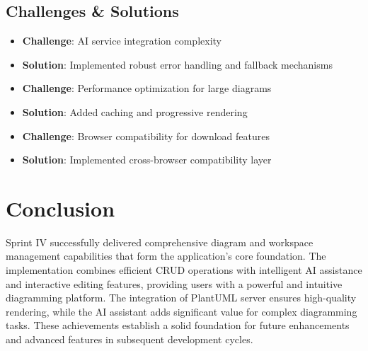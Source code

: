 \subsection{Challenges \& Solutions}
\begin{itemize}
    \item \textbf{Challenge}: AI service integration complexity
    \item \textbf{Solution}: Implemented robust error handling and fallback mechanisms
    \item \textbf{Challenge}: Performance optimization for large diagrams
    \item \textbf{Solution}: Added caching and progressive rendering
    \item \textbf{Challenge}: Browser compatibility for download features
    \item \textbf{Solution}: Implemented cross-browser compatibility layer
\end{itemize}



\section{Conclusion}

Sprint IV successfully delivered comprehensive diagram and workspace management capabilities that form the application's core foundation. The implementation combines efficient CRUD operations with intelligent AI assistance and interactive editing features, providing users with a powerful and intuitive diagramming platform. The integration of PlantUML server ensures high-quality rendering, while the AI assistant adds significant value for complex diagramming tasks. These achievements establish a solid foundation for future enhancements and advanced features in subsequent development cycles.